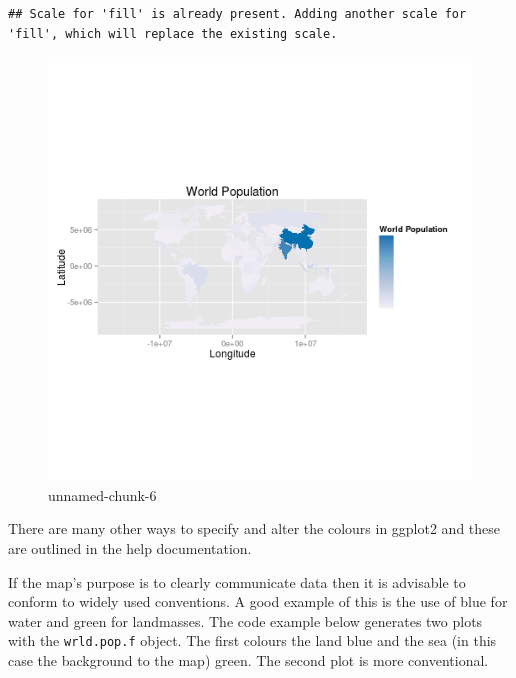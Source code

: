 \documentclass[]{article}
\begin{document}
\begin{verbatim}
## Scale for 'fill' is already present. Adding another scale for 'fill', which will replace the existing scale.
\end{verbatim}

\begin{figure}[htbp]
\centering
\includegraphics{figure/unnamed-chunk-6.png}
\caption{unnamed-chunk-6}
\end{figure}

There are many other ways to specify and alter the colours in ggplot2
and these are outlined in the help documentation.

If the map's purpose is to clearly communicate data then it is advisable
to conform to widely used conventions. A good example of this is the use
of blue for water and green for landmasses. The code example below
generates two plots with the \texttt{wrld.pop.f} object. The first
colours the land blue and the sea (in this case the background to the
map) green. The second plot is more conventional.
\end{document}
